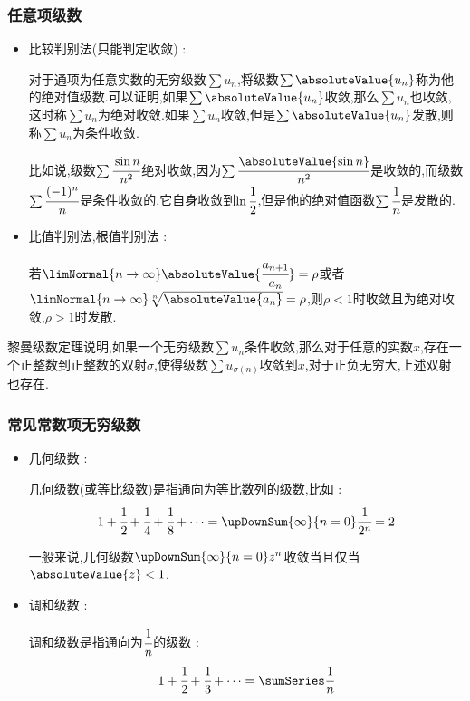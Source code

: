 {{{  \subsubsection{任意项级数}{

    \begin{itemize}
      \item {
            比较判别法(只能判定收敛) :

            对于通项为任意实数的无穷级数$\sum u_n$,将级数$\sum \absoluteValue{u_n}$称为他的绝对值级数.可以证明,如果$\sum \absoluteValue{u_n}$收敛,那么$\sum u_n$也收敛,这时称$\sum u_n$为绝对收敛.如果$\sum u_n$收敛,但是$\sum \absoluteValue{u_n}$发散,则称$\sum u_n$为条件收敛.

            比如说,级数$\sum \cfrac{\sin n}{n^2}$绝对收敛,因为$\sum \cfrac{\absoluteValue{\sin n}}{n^2}$是收敛的,而级数$\sum \cfrac{(-1)^n}{n}$是条件收敛的.它自身收敛到$\ln\cfrac{1}{2}$,但是他的绝对值函数$\sum \cfrac{1}{n}$是发散的.
            }
      \item {
            比值判别法,根值判别法 :

            若$\limNormal{n \to \infty} \absoluteValue{\cfrac{a_{n + 1}}{a_n}} = \rho$或者$\limNormal{n \to \infty}\sqrt[n]{\absoluteValue{a_n}} = \rho$,则$\rho < 1$时收敛且为绝对收敛,$\rho > 1$时发散.
            }
    \end{itemize}

    黎曼级数定理说明,如果一个无穷级数$\sum u_n$条件收敛,那么对于任意的实数$x$,存在一个正整数到正整数的双射$\sigma$,使得级数$\sum u_{\sigma(n)}$收敛到$x$,对于正负无穷大,上述双射也存在.
  }%

  \subsubsection{常见常数项无穷级数}{

    \begin{itemize}
      \item {
            几何级数 :

            几何级数(或等比级数)是指通向为等比数列的级数,比如 :
            $$
              1 + \cfrac{1}{2} + \cfrac{1}{4} + \cfrac{1}{8} + \dots = \upDownSum{\infty}{n = 0} \cfrac{1}{2^n} = 2
            $$

            一般来说,几何级数$\upDownSum{\infty}{n = 0}z^n$收敛当且仅当$\absoluteValue{z} < 1$.
            }
      \item{
            调和级数 :

            调和级数是指通向为$\cfrac{1}{n}$的级数 :
            $$
              1 + \cfrac{1}{2} + \cfrac{1}{3} + \dots = \sumSeries \cfrac{1}{n}
            $$

}
\end{itemize}}}}}
